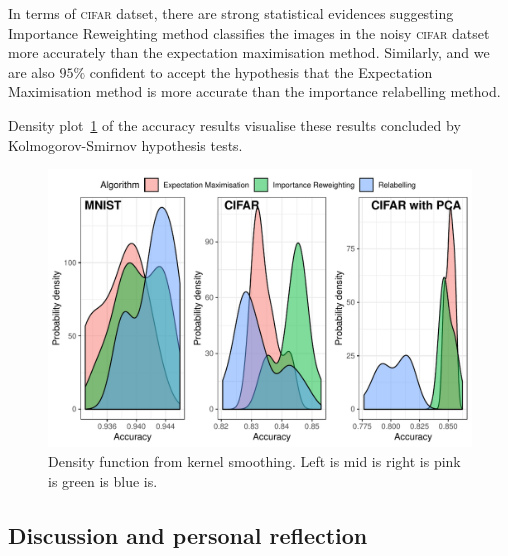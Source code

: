 \documentclass[12pt]{article} %
\begin{document}
In terms of \textsc{cifar} datset, there are strong statistical evidences suggesting Importance Reweighting method classifies the images in the noisy \textsc{cifar} datset more accurately than the expectation maximisation method. Similarly, and we are also $95\%$ confident to accept the hypothesis that the Expectation Maximisation method is more accurate than the importance relabelling method.

Density plot~\ref{fig:Density} of the accuracy results visualise these results concluded by Kolmogorov-Smirnov hypothesis tests.
\begin{figure}
    \centering
	\includegraphics[scale=0.8]{histo}
	\caption{Density function from kernel smoothing. Left is mid is right is pink is green is blue is.}
	\label{fig:Density}
\end{figure}




\subsection{Discussion and personal reflection}


\end{document}
